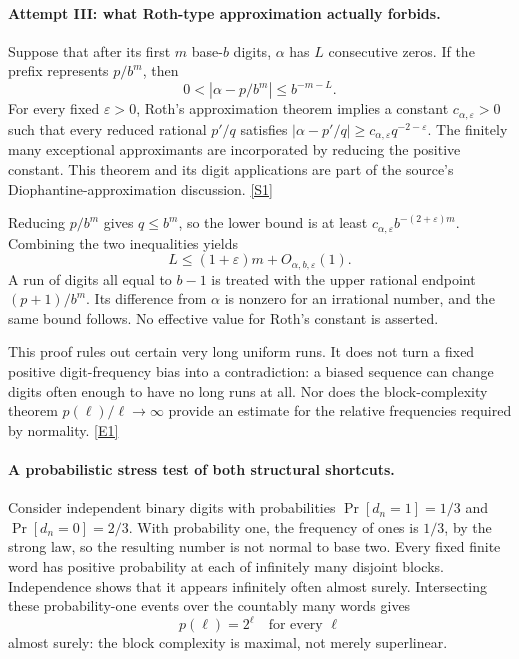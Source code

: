 \documentclass[11pt,a4paper]{article}
\newcommand{\sref}[2]{\hyperlink{source:#1:#2}{[S#2]}}
\newcommand{\eref}[2]{\hyperlink{extra:#1:#2}{[E#2]}}
\numberwithin{equation}{section}
\begin{document}
\paragraph{Attempt III: what Roth-type approximation actually forbids.}
Suppose that after its first $m$ base-$b$ digits, $\alpha$ has $L$
consecutive zeros.  If the prefix represents $p/b^m$, then
\[
 0<|\alpha-p/b^m|\leq b^{-m-L}.
\]
For every fixed $\varepsilon>0$, Roth's approximation theorem implies
a constant $c_{\alpha,\varepsilon}>0$ such that every reduced rational
$p'/q$ satisfies
$|\alpha-p'/q|\geq c_{\alpha,\varepsilon}q^{-2-\varepsilon}$.
The finitely many exceptional approximants are incorporated by reducing
the positive constant.  This theorem and its digit applications are
part of the source's Diophantine-approximation discussion.
\sref{133}{1}

Reducing $p/b^m$ gives $q\leq b^m$, so the lower bound is at least
$c_{\alpha,\varepsilon}b^{-(2+\varepsilon)m}$.  Combining the two
inequalities yields
\begin{equation}\label{133:runs}
 L\leq(1+\varepsilon)m+O_{\alpha,b,\varepsilon}(1).
\end{equation}
A run of digits all equal to $b-1$ is treated with the upper rational
endpoint $(p+1)/b^m$.  Its difference from $\alpha$ is nonzero for
an irrational number, and the same bound follows.  No effective value
for Roth's constant is asserted.

This proof rules out certain very long uniform runs.  It does not
turn a fixed positive digit-frequency bias into a contradiction:
a biased sequence can change digits often enough to have no long
runs at all.  Nor does the block-complexity theorem
$p(\ell)/\ell\to\infty$ provide an estimate for the relative
frequencies required by normality. \eref{133}{1}

\paragraph{A probabilistic stress test of both structural shortcuts.}
Consider independent binary digits with probabilities
$\Pr[d_n=1]=1/3$ and $\Pr[d_n=0]=2/3$.  With probability one, the
frequency of ones is $1/3$, by the strong law, so the resulting number
is not normal to base two.  Every fixed finite word has positive
probability at each of infinitely many disjoint blocks.  Independence
shows that it appears infinitely often almost surely.  Intersecting
these probability-one events over the countably many words gives
\[
 p(\ell)=2^\ell\quad\text{for every }\ell
\]
almost surely: the block complexity is maximal, not merely superlinear.
\end{document}

